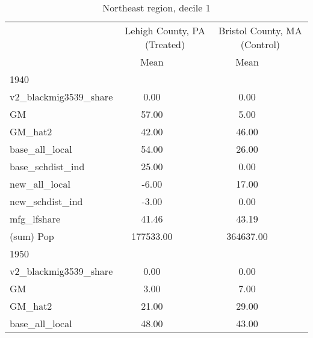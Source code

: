 \begin{table}[htbp]\centering
\def\sym#1{\ifmmode^{#1}\else\(^{#1}\)\fi}
\caption{Northeast region, decile 1 \label{tab1}}
\begin{tabular}{l*{2}{ccc}}
\toprule
                    &\multicolumn{3}{c}{Lehigh County, PA (Treated)}&\multicolumn{3}{c}{Bristol County, MA (Control)}\\
                    &        Mean&            &            &        Mean&            &            \\
\midrule
1940                &            &            &            &            &            &            \\
v2\_blackmig3539\_share&        0.00&            &            &        0.00&            &            \\
GM                  &       57.00&            &            &        5.00&            &            \\
GM\_hat2             &       42.00&            &            &       46.00&            &            \\
base\_all\_local      &       54.00&            &            &       26.00&            &            \\
base\_schdist\_ind    &       25.00&            &            &        0.00&            &            \\
new\_all\_local       &       -6.00&            &            &       17.00&            &            \\
new\_schdist\_ind     &       -3.00&            &            &        0.00&            &            \\
mfg\_lfshare         &       41.46&            &            &       43.19&            &            \\
(sum) Pop           &   177533.00&            &            &   364637.00&            &            \\
\midrule
1950                &            &            &            &            &            &            \\
v2\_blackmig3539\_share&        0.00&            &            &        0.00&            &            \\
GM                  &        3.00&            &            &        7.00&            &            \\
GM\_hat2             &       21.00&            &            &       29.00&            &            \\
base\_all\_local      &       48.00&            &            &       43.00&            &            \\

\end{tabular}
\end{table}

